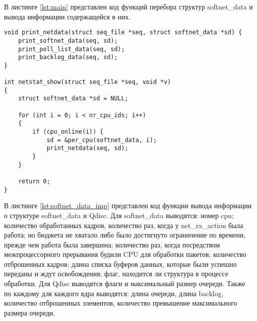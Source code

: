 В листинге \ref{lst:main} представлен код функций перебора структур softnet\_data и вывода информации содержащейся в них.

\begin{center}
	\captionsetup{justification=raggedright,singlelinecheck=off}
	\begin{lstlisting}[label=lst:main,caption=Функции перебора и вывода информации о структуре softnet\_data ,showstringspaces=false]
void print_netdata(struct seq_file *seq, struct softnet_data *sd) {
	print_softnet_data(seq, sd);
	print_poll_list_data(seq, sd);
	print_backlog_data(seq, sd);
}

int netstat_show(struct seq_file *seq, void *v)
{
	struct softnet_data *sd = NULL;
	
	for (int i = 0; i < nr_cpu_ids; i++)
	{
		if (cpu_online(i)) {
			sd = &per_cpu(softnet_data, i);
			print_netdata(seq, sd);
		}
	}
	
	return 0;
}
	\end{lstlisting}
\end{center}
\FloatBarrier

В листинге \ref{lst:softnet_data_imp} представлен код функции вывода информации о структуре softnet\_data и Qdisc. Для softnet\_data выводятся: номер cpu; количество обработанных кадров, количество раз, когда у net\_rx\_action была работа; но бюджета не хватало либо было достигнуто ограничение по времени, прежде чем работа была завершена; количество раз, когда посредством межпроцессорного прерывания будили CPU для обработки пакетов; количество отброшенных кадров; длина списка буферов данных, которые были успешно переданы и ждут освобождения; флаг, находится ли структура в процессе обработки. Для Qdisc выводятся флаги и максимальный размер очереди. Также по каждому для каждого ядра выводятся: длина очереди, длина backlog, количество отброшенных элементов, количество превышение максимального размера очереди.

